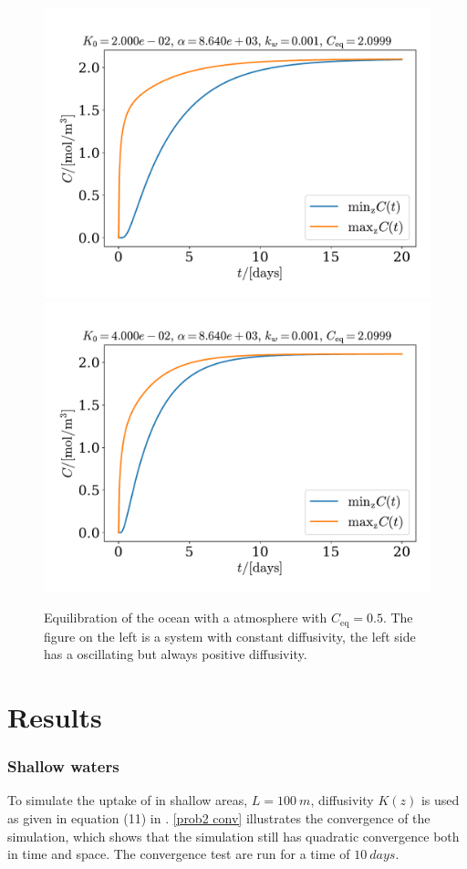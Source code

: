 \documentclass{article}
\begin{document}
    \begin{figure}
        \centering
        \includegraphics[width=.49\textwidth]{../plots/test5_minmax}
        \includegraphics[width=.49\textwidth]{../plots/test5_varK_minmax}
        \caption{Equilibration of the ocean with a atmosphere with $C_\mathrm{eq}=0.5$. The figure on the left is a system with constant diffusivity, the left side has a oscillating but always positive diffusivity.}
        \label{minmax}
    \end{figure}

    \section*{Results}
    \subsubsection*{Shallow waters}
    To simulate the uptake of  in shallow areas, $L=\SI{100}{m}$, diffusivity $K(z)$ is used as given in equation (11) in \cite{exercise}. \autoref{prob2 conv} illustrates the convergence of the simulation, which shows that the simulation still has quadratic convergence both in time and space. The convergence test are run for a time of $\SI{10}{days}$.
\end{document}
